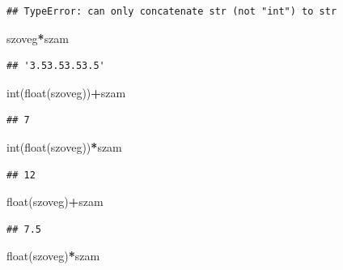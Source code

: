 \documentclass[
]{book}
\newenvironment{Shaded}{\begin{snugshade}}{\end{snugshade}}
\newcommand{\BuiltInTok}[1]{#1}
\newcommand{\NormalTok}[1]{#1}
\newcommand{\OperatorTok}[1]{\textcolor[rgb]{0.81,0.36,0.00}{\textbf{#1}}}
\begin{document}
\begin{verbatim}
## TypeError: can only concatenate str (not "int") to str
\end{verbatim}

\begin{Shaded}
\begin{Highlighting}[]
\NormalTok{szoveg}\OperatorTok{*}\NormalTok{szam}
\end{Highlighting}
\end{Shaded}

\begin{verbatim}
## '3.53.53.53.5'
\end{verbatim}

\begin{Shaded}
\begin{Highlighting}[]
\BuiltInTok{int}\NormalTok{(}\BuiltInTok{float}\NormalTok{(szoveg))}\OperatorTok{+}\NormalTok{szam}
\end{Highlighting}
\end{Shaded}

\begin{verbatim}
## 7
\end{verbatim}

\begin{Shaded}
\begin{Highlighting}[]
\BuiltInTok{int}\NormalTok{(}\BuiltInTok{float}\NormalTok{(szoveg))}\OperatorTok{*}\NormalTok{szam}
\end{Highlighting}
\end{Shaded}

\begin{verbatim}
## 12
\end{verbatim}

\begin{Shaded}
\begin{Highlighting}[]
\BuiltInTok{float}\NormalTok{(szoveg)}\OperatorTok{+}\NormalTok{szam}
\end{Highlighting}
\end{Shaded}

\begin{verbatim}
## 7.5
\end{verbatim}

\begin{Shaded}
\begin{Highlighting}[]
\BuiltInTok{float}\NormalTok{(szoveg)}\OperatorTok{*}\NormalTok{szam}
\end{Highlighting}
\end{Shaded}
\end{document}
